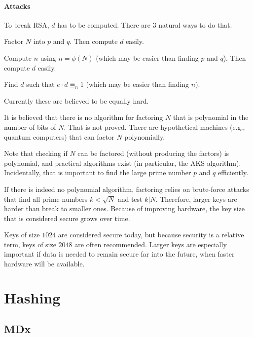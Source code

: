 \paragraph{Attacks}
To break RSA, $d$ has to be computed.
There are $3$ natural ways to do that:
\begin{compactitem}
 \item Factor $N$ into $p$ and $q$. Then compute $d$ easily.
 \item Compute $n$ using $n=\phi(N)$ (which may be easier than finding $p$ and $q$). Then compute $d$ easily.
 \item Find $d$ such that $e\cdot d\Equiv_n 1$ (which may be easier than finding $n$).
\end{compactitem}
Currently these are believed to be equally hard.

It is believed that there is no algorithm for factoring $N$ that is polynomial in the number of bits of $N$.
That is not proved.
There are hypothetical machines (e.g., quantum computers) that can factor $N$ polynomially.

Note that checking if $N$ can be factored (without producing the factors) is polynomial, and practical algorithms exist (in particular, the AKS algorithm).
Incidentally, that is important to find the large prime number $p$ and $q$ efficiently.
\medskip

If there is indeed no polynomial algorithm, factoring relies on brute-force attacks that find all prime numbers $k<\sqrt{N}$ and test $k|N$.
Therefore, larger keys are harder than break to smaller ones.
Because of improving hardware, the key size that is considered secure grows over time.

Keys of size $1024$ are considered secure today, but because security is a relative term, keys of size $2048$ are often recommended. 
Larger keys are especially important if data is needed to remain secure far into the future, when faster hardware will be available.

\section{Hashing}\label{sec:sd:crypto:hash}

\subsection{MDx}

